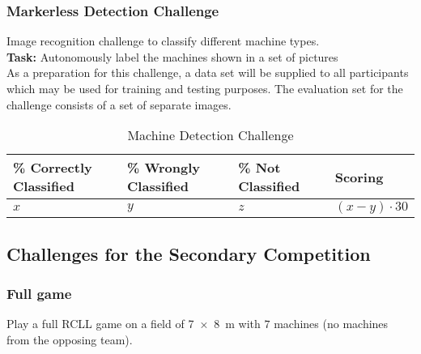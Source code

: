 \documentclass[12pt,twoside]{article}
\begin{document}
\subsubsection{Markerless Detection Challenge}\label{sec:markerless}
Image recognition challenge to classify different machine types.\\
\textbf{Task:} Autonomously label the machines shown in a set of pictures\\
As a preparation for this challenge, a data set will be supplied to
all participants which may be used for training and testing purposes.
The evaluation set for the challenge consists of a set of separate images.
\begin{table}[!htb]
    \centering
        \begin{tabularx}{\linewidth}{l|l|l|l}
					 \% Correctly Classified & \% Wrongly Classified & \% Not Classified
																	 & Scoring \\\hline
					 $x$ & $y$ & $z$ & $(x-y)\cdot30$
        \end{tabularx}
    \caption{Machine Detection Challenge}
    \label{tab:challenge-markerless}
\end{table}

\subsection{Challenges for the Secondary Competition}

\subsubsection{Full game}\label{sec:challenge-full-game}
Play a full RCLL game on a field of \SI{7 x 8}{\metre} with $7$ machines
(no machines from the opposing team).
\end{document}
